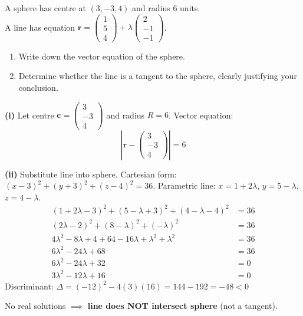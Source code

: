 
\begin{problem}
A sphere has centre at $(3, -3, 4)$ and radius 6 units. \\ 
A line has equation $\mathbf{r} = \begin{pmatrix} 1 \\ 5 \\ 4 \end{pmatrix} + \lambda \begin{pmatrix} 2 \\ -1 \\ -1 \end{pmatrix}$.
\begin{enumerate}[label=(\roman*)]
    \item Write down the vector equation of the sphere.
    \item Determine whether the line is a tangent to the sphere, clearly justifying your conclusion.
\end{enumerate}
\end{problem}

\begin{solution}
\textbf{(i)} Let centre $\mathbf{c} = \begin{pmatrix} 3 \\ -3 \\ 4 \end{pmatrix}$ and radius $R = 6$. Vector equation:
$$\left| \mathbf{r} - \begin{pmatrix} 3 \\ -3 \\ 4 \end{pmatrix} \right| = 6$$
\vspace{-2mm}

\textbf{(ii)} Substitute line into sphere. Cartesian form: $(x-3)^2 + (y+3)^2 + (z-4)^2 = 36$.
Parametric line: $x = 1 + 2\lambda$, $y = 5 - \lambda$, $z = 4 - \lambda$.
\vspace{-2mm}
\begin{align*}
(1+2\lambda-3)^2 + (5-\lambda+3)^2 + (4-\lambda-4)^2 &= 36\\
(2\lambda-2)^2 + (8-\lambda)^2 + (-\lambda)^2 &= 36\\
4\lambda^2 - 8\lambda + 4 + 64 - 16\lambda + \lambda^2 + \lambda^2 &= 36\\
6\lambda^2 - 24\lambda + 68 &= 36\\
6\lambda^2 - 24\lambda + 32 &= 0\\
3\lambda^2 - 12\lambda + 16 &= 0
\end{align*}
Discriminant: $\Delta = (-12)^2 - 4(3)(16) = 144 - 192 = -48 < 0$

No real solutions $\implies$ \textbf{line does NOT intersect sphere} (not a tangent).
\end{solution}

